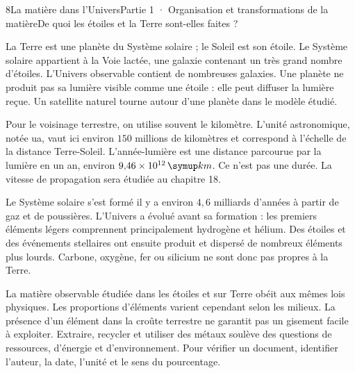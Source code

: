 \begin{ouverture}[college1]{8}{La matière dans l’Univers}{Partie 1 · Organisation et transformations de la matière}{De quoi les étoiles et la Terre sont-elles faites ?}
\end{ouverture}
\label{ess-8}
La Terre est une planète du Système solaire ; le Soleil est son étoile. Le Système solaire appartient à la Voie lactée, une galaxie contenant un très grand nombre d’étoiles. L’Univers observable contient de nombreuses galaxies. Une planète ne produit pas sa lumière visible comme une étoile : elle peut diffuser la lumière reçue. Un satellite naturel tourne autour d’une planète dans le modèle étudié.\par
{}
Pour le voisinage terrestre, on utilise souvent le kilomètre. L’unité astronomique, notée ua, vaut ici environ $150$ millions de kilomètres et correspond à l’échelle de la distance Terre-Soleil. L’année-lumière est une distance parcourue par la lumière en un an, environ $9{,}46\times10^{12}\unite{km}$. Ce n’est pas une durée. La vitesse de propagation sera étudiée au chapitre 18.\par
\clearpage
{}
Le Système solaire s’est formé il y a environ $4{,}6$ milliards d’années à partir de gaz et de poussières. L’Univers a évolué avant sa formation : les premiers éléments légers comprennent principalement hydrogène et hélium. Des étoiles et des événements stellaires ont ensuite produit et dispersé de nombreux éléments plus lourds. Carbone, oxygène, fer ou silicium ne sont donc pas propres à la Terre.\par
{}
La matière observable étudiée dans les étoiles et sur Terre obéit aux mêmes lois physiques. Les proportions d’éléments varient cependant selon les milieux. La présence d’un élément dans la croûte terrestre ne garantit pas un gisement facile à exploiter. Extraire, recycler et utiliser des métaux soulève des questions de ressources, d’énergie et d’environnement. Pour vérifier un document, identifier l’auteur, la date, l’unité et le sens du pourcentage.\par
